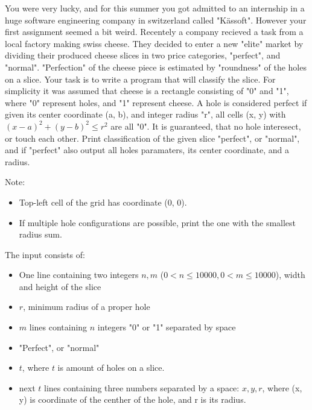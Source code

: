 \problemname{\problemyamlname}


\newcommand{\maxn}{10000}

You were very lucky, and for this summer you got admitted to an internship in a huge software engineering company in switzerland called "Kässoft". 
However your first assignment seemed a bit weird. Recentely a company recieved a task from a local factory making swiss cheese. They decided to enter a new "elite" market by dividing their produced cheese slices in two price categories, "perfect", and "normal".
"Perfection" of the cheese piece is estimated by "roundness" of the holes on a slice. Your task is to write a program that will classify the slice.
For simplicity it was assumed that cheese is a rectangle consisting of "0" and "1", where "0" represent holes, and "1" represent cheese. 
A hole is considered perfect if given its center coordinate (a, b), and integer radius "r", all cells (x, y) with $(x - a)^2 + (y - b)^2 \leq r^2$ are all "0". It is guaranteed, that no hole interesect, or touch each other.
Print classification of the given slice "perfect", or "normal", and if "perfect" also output all holes paramaters, its center coordinate, and a radius.

Note:
\begin{itemize}
    \item Top-left cell of the grid has coordinate (0, 0).
    \item If multiple hole configurations are possible, print the one with the smallest radius sum.
\end{itemize}

\begin{Input}
    The input consists of:
    \begin{itemize}
        \item One line containing two integers $n, m$ ($0 < n\leq \maxn, 0 < m \leq \maxn$), width and height of the slice
        \item $r$, minimum radius of a proper hole
        \item $m$ lines containing $n$ integers "0" or "1" separated by space
    \end{itemize}
\end{Input}

\begin{Output}
    \begin{itemize}
        \item "Perfect", or "normal"
        \item $t$, where $t$ is amount of holes on a slice.
        \item next $t$ lines containing three numbers separated by a space: $x, y, r$, where (x, y) is coordinate of the centher of the hole, and r is its radius.
    \end{itemize}
\end{Output}



